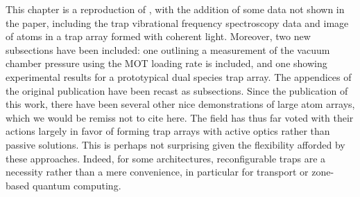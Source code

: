 

This chapter is a reproduction of \cite{PHuft2022}, with the addition of some data not shown in the paper, including the trap vibrational frequency spectroscopy data and image of atoms in a trap array formed with coherent light. Moreover, two new subsections have been included: one outlining a measurement of the vacuum chamber pressure using the MOT loading rate is included, and one showing experimental results for a prototypical dual species trap array. The appendices of the original publication have been recast as subsections. Since the publication of this work, there have been several other nice demonstrations of large atom arrays, which we would be remiss not to cite here\cite{manetsch2024,Pause2024,gyger2024continuous}. The field has thus far voted with their actions largely in favor of forming trap arrays with active optics rather than passive solutions. This is perhaps not surprising given the flexibility afforded by these approaches. Indeed, for some architectures, reconfigurable traps are a necessity rather than a mere convenience, in particular for transport or zone-based quantum computing\cite{Bluvstein2022,li2024high}.


